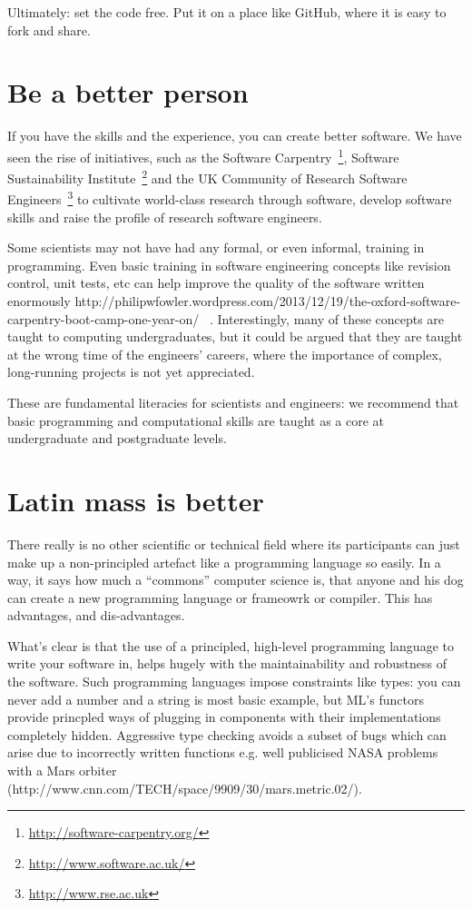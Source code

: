 \documentclass[conference]{IEEEtran}
\begin{document}
Ultimately: set the code free. Put it on a place like GitHub, where it
is easy to fork and share.


\section{Be a better person}

If you have the skills and the experience, you can create better
software. We have seen the rise of initiatives, such as the Software
Carpentry~\footnote{\url{http://software-carpentry.org/}}, Software
Sustainability Institute~\footnote{\url{http://www.software.ac.uk/}}
and the UK Community of Research Software
Engineers~\footnote{\url{http://www.rse.ac.uk}} to cultivate
world-class research through software, develop software skills and
raise the profile of research software engineers.

Some scientists may not have had any formal, or even informal,
training in programming. Even basic training in software engineering
concepts like revision control, unit tests, etc can help improve the
quality of the software written enormously
http://philipwfowler.wordpress.com/2013/12/19/the-oxford-software-carpentry-boot-camp-one-year-on/
~\cite{Wilson2014}.  Interestingly, many of these concepts are taught
to computing undergraduates, but it could be argued that they are
taught at the wrong time of the engineers' careers, where the
importance of complex, long-running projects is not yet appreciated.

These are fundamental literacies for scientists and engineers: we
recommend that basic programming and computational skills are taught
as a core at undergraduate and postgraduate levels.


\section{Latin mass is better}

There really is no other scientific or technical field where its
participants can just make up a non-principled artefact like a
programming language so easily. In a way, it says how much a
``commons'' computer science is, that anyone and his dog can create a
new programming language or frameowrk or compiler. This has
advantages, and dis-advantages.

What's clear is that the use of a principled, high-level programming
language to write your software in, helps hugely with the
maintainability and robustness of the software. Such programming
languages impose constraints like types: you can never add a number
and a string is most basic example, but ML's functors provide
princpled ways of plugging in components with their implementations
completely hidden. Aggressive type checking avoids a subset of bugs
which can arise due to incorrectly written functions e.g. well
publicised NASA problems with a Mars orbiter
(http://www.cnn.com/TECH/space/9909/30/mars.metric.02/).
\end{document}
